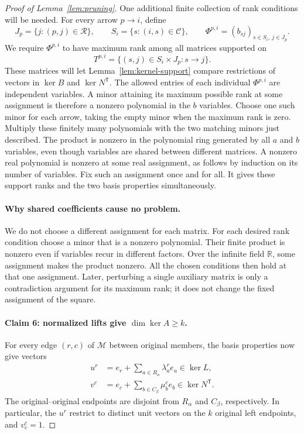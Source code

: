 \begin{proof}[Proof of Lemma~\ref{lem:pruning}]
One additional finite collection of rank conditions will be needed.
For every arrow $p\to i$, define
\[
 J_p=\{j:(p,j)\in\mathcal R\},\qquad
 S_i=\{s:(i,s)\in\mathcal C\},\qquad
 \Phi^{p,i}=(b_{sj})_{s\in S_i,\ j\in J_p}.
\]
We require $\Phi^{p,i}$ to have maximum rank among all matrices supported
on
\[
 T^{p,i}=\{(s,j)\in S_i\times J_p:s\to j\}.
\]
These matrices will let Lemma~\ref{lem:kernel-support} compare restrictions
of vectors in $\ker B$ and $\ker N^{\mathsf T}$.
The allowed entries of each individual $\Phi^{p,i}$ are independent
variables.  A minor attaining its maximum possible rank at some
assignment is therefore a nonzero polynomial in the $b$ variables.
Choose one such minor for each arrow, taking the empty minor when the
maximum rank is zero.  Multiply these finitely many polynomials with
the two matching minors just described.  The product is nonzero in the
polynomial ring generated by all $a$ and $b$ variables, even though
variables are shared between different matrices.  A nonzero real
polynomial is nonzero at some real assignment, as follows by induction
on its number of variables.  Fix such an assignment once and for all.
It gives these support ranks and the two basis properties simultaneously.


\paragraph{Why shared coefficients cause no problem.}
We do not choose a different assignment for each matrix. For each desired
rank condition choose a minor that is a nonzero polynomial. Their finite
product is nonzero even if variables recur in different factors. Over the
infinite field $\mathbb R$, some assignment makes the product nonzero.
All the chosen conditions then hold at that one assignment. Later,
perturbing a single auxiliary matrix is only a contradiction argument for
its maximum rank; it does not change the fixed assignment of the square.

\paragraph{Claim 6: normalized lifts give $\dim\ker A\ge k$.}
For every edge $(r,c)$ of $\mathcal M$ between original members, the
basis properties now give vectors
\begin{equation}\label{eq:pruning-lifts}
 \begin{aligned}
 u^r&=e_r+\sum_{a\in R_\alpha}\lambda_a^r e_a
                 \in\ker L,\\
 v^c&=e_c+\sum_{b\in C_\beta}\mu_b^c e_b
                 \in\ker N^{\mathsf T}.
 \end{aligned}
\end{equation}
The original--original endpoints are disjoint from $R_\alpha$ and
$C_\beta$, respectively.  In particular, the $u^r$ restrict to distinct
unit vectors on the $k$ original left endpoints, and $v^c_c=1$.


\end{proof}
